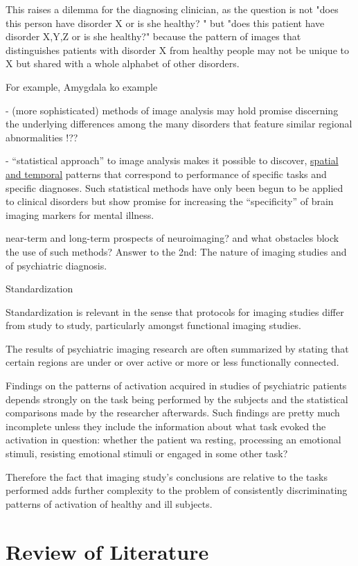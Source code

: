 \documentclass{article}
\begin{document}
This raises a dilemma for the diagnosing clinician, as the
question is not "does this person have disorder X or is she
healthy? " but "does this patient have disorder X,Y,Z or is she
healthy?" because the pattern of images that distinguishes
patients with disorder X from healthy people may not be unique to
X but shared with a whole alphabet of other disorders.

For example, Amygdala ko example

- (more sophisticated) methods of image analysis may hold promise
  discerning the underlying differences among the many disorders
  that feature similar regional abnormalities !??


- ``statistical approach'' to image analysis makes it possible to
  discover, \underline{spatial and temporal} patterns that
  correspond to performance of specific tasks and specific
  diagnoses. Such statistical methods have only been begun to be
  applied to clinical disorders but show promise for increasing
  the ``specificity'' of brain imaging markers for mental illness.


near-term and long-term prospects of neuroimaging? and what
obstacles block the use of such methods? Answer to the 2nd: The
nature of imaging studies and of psychiatric diagnosis.

Standardization

Standardization is relevant in the sense that protocols for
imaging studies differ from study to study, particularly amongst
functional imaging studies.

The results of psychiatric imaging research are often summarized
by stating that certain regions are under or over active or more
or less functionally connected.

Findings on the patterns of activation acquired in studies of
psychiatric patients depends strongly on the task being performed
by the subjects and the statistical comparisons made by the
researcher afterwards. Such findings are pretty much incomplete
unless they include the information about what task evoked the
activation in question: whether the patient wa resting, processing
an emotional stimuli, resisting emotional stimuli or engaged in
some other task?

Therefore the fact that imaging study's conclusions are relative
to the tasks performed adds further complexity to the problem of
consistently discriminating patterns of activation of healthy and
ill subjects.

\newpage
\section{Review of Literature}
\end{document}
